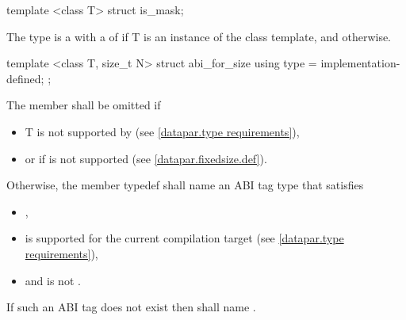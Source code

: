 \begin{itemdecl}
template <class T> struct is_mask;
\end{itemdecl}
\begin{itemdescr}
  \pnum The type  is a \UnaryTypeTrait with a \BaseCharacteristic of  if \type T is an instance of the \mask class template, and  otherwise.
\end{itemdescr}

\begin{itemdecl}
template <class T, size_t N> struct abi_for_size { using type = implementation-defined; };
\end{itemdecl}
\begin{itemdescr}
  \pnum The member  shall be omitted if
  \begin{itemize}
    \item \type T is not supported by \datapar (see \ref{datapar.type requirements}),
    \item or if \fixedsizeN is not supported (see \ref{datapar.fixedsize.def}).
  \end{itemize}

  \pnum Otherwise, the member typedef  shall name an ABI tag type that satisfies
  \begin{itemize}
    \item {},
    \item \datapar[<T, type>] is supported for the current compilation target (see \ref{datapar.type requirements}),
    \item and  is not \fixedsizeN.
  \end{itemize}
  If such an ABI tag does not exist then  shall name \fixedsizeN.
\end{itemdescr}

